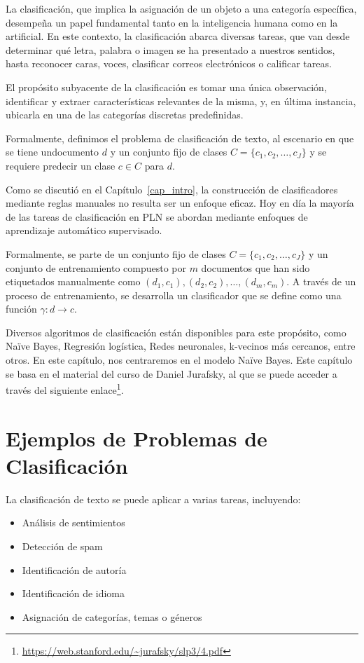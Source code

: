 
La clasificación, que implica la asignación de un objeto a una categoría específica, desempeña un papel fundamental tanto en la inteligencia humana como en la artificial. En este contexto, la clasificación abarca diversas tareas, que van desde determinar qué letra, palabra o imagen se ha presentado a nuestros sentidos, hasta reconocer caras, voces, clasificar correos electrónicos o calificar tareas. 

El propósito subyacente de la clasificación es tomar una única observación, identificar y extraer características relevantes de la misma, y, en última instancia, ubicarla en una de las categorías discretas predefinidas. 

\begin{definition}
Formalmente, definimos el problema de clasificación de texto, al escenario en que se tiene undocumento $d$ y un conjunto fijo de clases $C = \{c_1, c_2, \ldots, c_J\}$ y se requiere predecir un clase  $c \in C$ para $d$.
\end{definition}

Como se discutió en el Capítulo~\ref{cap_intro}, la construcción de clasificadores mediante reglas manuales no resulta ser un enfoque eficaz. Hoy en día la mayoría de las tareas de clasificación en PLN se abordan mediante enfoques de aprendizaje automático supervisado.

Formalmente, se parte de un conjunto fijo de clases $C = \{c_1, c_2, \ldots, c_J\}$ y un conjunto de entrenamiento compuesto por $m$ documentos que han sido etiquetados manualmente como $(d_1, c_1), (d_2, c_2), \ldots, (d_m, c_m)$. A través de un proceso de entrenamiento, se desarrolla un clasificador que se define como una función $\gamma: d \to c$.

Diversos algoritmos de clasificación están disponibles para este propósito, como Naïve Bayes, Regresión logística, Redes neuronales, k-vecinos más cercanos, entre otros. En este capítulo, nos centraremos en el modelo Naïve Bayes. Este capítulo se basa en el material del curso de Daniel Jurafsky, al que se puede acceder a través del siguiente enlace\footnote{\url{https://web.stanford.edu/~jurafsky/slp3/4.pdf}}.

\section{Ejemplos de Problemas de Clasificación}
La clasificación de texto se puede aplicar a varias tareas, incluyendo:

\begin{itemize}
    \item Análisis de sentimientos
    \item Detección de spam
    \item Identificación de autoría
    \item Identificación de idioma
    \item Asignación de categorías, temas o géneros
\end{itemize}

